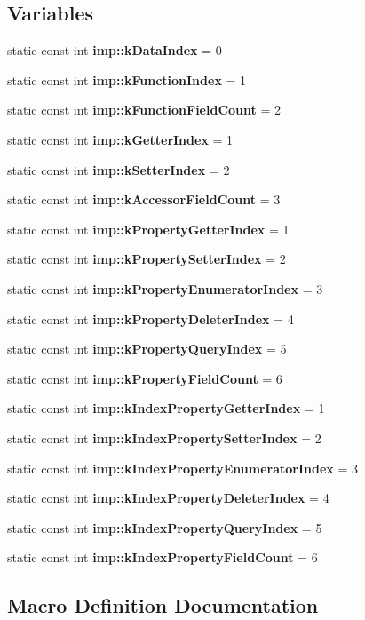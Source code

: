 \subsection*{Variables}
\begin{DoxyCompactItemize}
\item 
static const int \textbf{ imp\+::k\+Data\+Index} = 0
\item 
static const int \textbf{ imp\+::k\+Function\+Index} = 1
\item 
static const int \textbf{ imp\+::k\+Function\+Field\+Count} = 2
\item 
static const int \textbf{ imp\+::k\+Getter\+Index} = 1
\item 
static const int \textbf{ imp\+::k\+Setter\+Index} = 2
\item 
static const int \textbf{ imp\+::k\+Accessor\+Field\+Count} = 3
\item 
static const int \textbf{ imp\+::k\+Property\+Getter\+Index} = 1
\item 
static const int \textbf{ imp\+::k\+Property\+Setter\+Index} = 2
\item 
static const int \textbf{ imp\+::k\+Property\+Enumerator\+Index} = 3
\item 
static const int \textbf{ imp\+::k\+Property\+Deleter\+Index} = 4
\item 
static const int \textbf{ imp\+::k\+Property\+Query\+Index} = 5
\item 
static const int \textbf{ imp\+::k\+Property\+Field\+Count} = 6
\item 
static const int \textbf{ imp\+::k\+Index\+Property\+Getter\+Index} = 1
\item 
static const int \textbf{ imp\+::k\+Index\+Property\+Setter\+Index} = 2
\item 
static const int \textbf{ imp\+::k\+Index\+Property\+Enumerator\+Index} = 3
\item 
static const int \textbf{ imp\+::k\+Index\+Property\+Deleter\+Index} = 4
\item 
static const int \textbf{ imp\+::k\+Index\+Property\+Query\+Index} = 5
\item 
static const int \textbf{ imp\+::k\+Index\+Property\+Field\+Count} = 6
\end{DoxyCompactItemize}


\subsection{Macro Definition Documentation}
\mbox{\label{nan_8h_a5d00305da4565a87539cc73e5b3e75f2}} 
